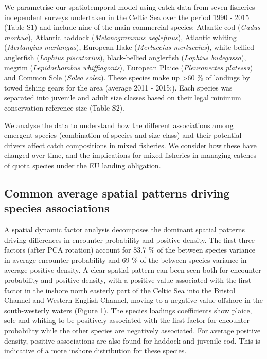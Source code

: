 \documentclass{nature}
\begin{document}
\begin{linenumbers}
We parametrise our spatiotemporal model using catch data from seven
fisheries-independent surveys undertaken in the Celtic Sea over the period 1990
- 2015 (Table S1) and include nine of the main commercial species: Atlantic cod
(\textit{Gadus morhua}), Atlantic haddock (\textit{Melanogrammus aeglefinus}),
Atlantic whiting (\textit{Merlangius merlangus}), European Hake
(\textit{Merluccius merluccius}), white-bellied anglerfish (\textit{Lophius
	piscatorius}), black-bellied anglerfish (\textit{Lophius budegassa}),
megrim (\textit{Lepidorhombus whiffiagonis}), European Plaice
(\textit{Pleuronectes platessa}) and Common Sole (\textit{Solea solea}). These
species make up \textgreater 60 \% of landings by towed fishing gears for the
area (average 2011 - 2015;\cite{STECF2017}). Each species was separated into
juvenile and adult size classes based on their legal minimum conservation
reference size (Table S2).

We analyse the data to understand how the different associations among emergent
species (combination of species and size class) and their potential
drivers affect catch compositions in mixed fisheries. We consider how these
have changed over time, and the implications for mixed fisheries in managing
catches of quota species under the EU landing obligation.

\subsection{Common average spatial patterns driving species associations} A
spatial dynamic factor analysis decomposes the dominant spatial patterns
driving differences in encounter probability and positive density. The first
three factors (after PCA rotation) account for 83.7 \% of the between
species variance in average encounter probability and 69 \% of the
between species variance in average positive density. A clear spatial
pattern can been seen both for encounter probability and positive density, with
a positive value associated with the first factor in the inshore north easterly
part of the Celtic Sea into the Bristol Channel and Western English Channel,
moving to a negative value offshore in the south-westerly waters (Figure 1).
The species loadings coefficients show plaice, sole and whiting to be
positively associated with the first factor for encounter probability while the
other species are negatively associated. For average positive density,
positive associations are also found for haddock and juvenile cod. This is
indicative of a more inshore distribution for these species. 


\end{linenumbers}
\end{document}
